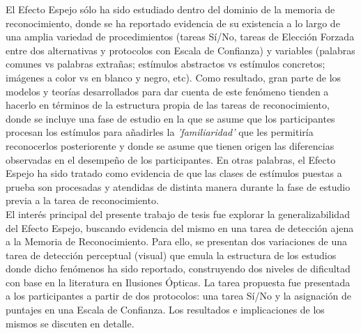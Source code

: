 El Efecto Espejo sólo ha sido estudiado dentro del dominio de la memoria de reconocimiento, donde se ha reportado evidencia de su existencia a lo largo de una amplia variedad de procedimientos (tareas Sí/No, tareas de Elección Forzada entre dos alternativas y protocolos con Escala de Confianza) y variables (palabras comunes vs palabras extrañas; estímulos abstractos vs estímulos concretos; imágenes a color vs en blanco y negro, etc). Como resultado, gran parte de los modelos y teorías desarrollados para dar cuenta de este fenómeno tienden a hacerlo en términos de la estructura propia de las tareas de reconocimiento, donde se incluye una fase de estudio en la que se asume que los participantes procesan los estímulos para añadirles la \textit{'familiaridad'} que les permitiría reconocerlos posteriorente y donde se asume que tienen origen las diferencias observadas en el desempeño de los participantes. En otras palabras, el Efecto Espejo ha sido tratado como evidencia de que las clases de estímulos puestas a prueba son procesadas y atendidas de distinta manera durante la fase de estudio previa a la tarea de reconocimiento.\\

El interés principal del presente trabajo de tesis fue explorar la generalizabilidad del Efecto Espejo, buscando evidencia del mismo en una tarea de detección ajena a la Memoria de Reconocimiento. Para ello, se presentan dos variaciones de una tarea de detección perceptual (visual) que emula la estructura de los estudios donde dicho fenómenos ha sido reportado, construyendo dos niveles de dificultad con base en la literatura en Ilusiones Ópticas. La tarea propuesta fue presentada a los participantes a partir de dos protocolos: una tarea Sí/No y la asignación de puntajes en una Escala de Confianza. Los resultados e implicaciones de los mismos se discuten en detalle.\\